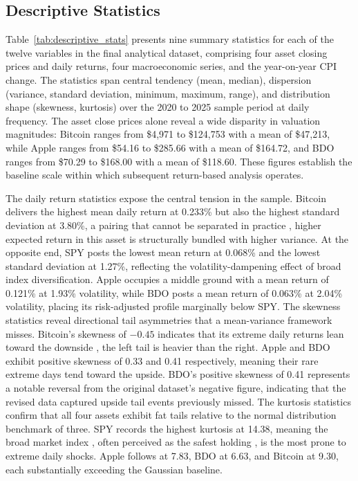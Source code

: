 \subsection{Descriptive Statistics}

Table~\ref{tab:descriptive_stats} presents nine summary statistics for each of the twelve variables in the final analytical dataset, comprising four asset closing prices and daily returns, four macroeconomic series, and the year-on-year CPI change. The statistics span central tendency (mean, median), dispersion (variance, standard deviation, minimum, maximum, range), and distribution shape (skewness, kurtosis) over the 2020 to 2025 sample period at daily frequency. The asset close prices alone reveal a wide disparity in valuation magnitudes: Bitcoin ranges from \$4,971 to \$124,753 with a mean of \$47,213, while Apple ranges from \$54.16 to \$285.66 with a mean of \$164.72, and BDO ranges from \$70.29 to \$168.00 with a mean of \$118.60. These figures establish the baseline scale within which subsequent return-based analysis operates.



The daily return statistics expose the central tension in the sample. Bitcoin delivers the highest mean daily return at 0.233\% but also the highest standard deviation at 3.80\%, a pairing that cannot be separated in practice ,  higher expected return in this asset is structurally bundled with higher variance. At the opposite end, SPY posts the lowest mean return at 0.068\% and the lowest standard deviation at 1.27\%, reflecting the volatility-dampening effect of broad index diversification. Apple occupies a middle ground with a mean return of 0.121\% at 1.93\% volatility, while BDO posts a mean return of 0.063\% at 2.04\% volatility, placing its risk-adjusted profile marginally below SPY. The skewness statistics reveal directional tail asymmetries that a mean-variance framework misses. Bitcoin's skewness of \(-0.45\) indicates that its extreme daily returns lean toward the downside ,  the left tail is heavier than the right. Apple and BDO exhibit positive skewness of 0.33 and 0.41 respectively, meaning their rare extreme days tend toward the upside. BDO's positive skewness of 0.41 represents a notable reversal from the original dataset's negative figure, indicating that the revised data captured upside tail events previously missed. The kurtosis statistics confirm that all four assets exhibit fat tails relative to the normal distribution benchmark of three. SPY records the highest kurtosis at 14.38, meaning the broad market index ,  often perceived as the safest holding ,  is the most prone to extreme daily shocks. Apple follows at 7.83, BDO at 6.63, and Bitcoin at 9.30, each substantially exceeding the Gaussian baseline.

